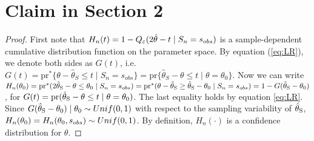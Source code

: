 	
\section{Claim in Section 2} 
\begin{proof} First note that $H_n(t) = 1 - Q_{\veps}(2\hat{\theta}-t \mid S_n = s_{obs})$ is a sample-dependent cumulative distribution function on the parameter space. 
By equation (\ref{eq:LR}), we denote both sides as $G(t)$, i.e. $G(t) = \text{pr}^*\{ \theta - \hat \theta_S \leq t \mid S_n = s_{obs} \} = \text{pr}\{\hat \theta_S - \theta \leq t \mid  \theta = \theta_0\}$.
Now we can write $H_n(\theta_0)  
		= \text{pr}^*(2\htheta - \theta \leq \theta_0 \mid  S_n = s_{\rm obs} )
		= \text{pr}^*(\theta - \htheta \geq \htheta- \theta_0 \mid  S_n = s_{\rm obs} )
		= 1 - G(\htheta - \theta_0)$, for $G(t) = \text{pr}(\htheta - \theta \leq t \mid \theta = \theta_0)$. The last equality holds by equation \eqref{eq:LR}. Since $G(\htheta - \theta_0) \mid  \theta_0 \sim Unif(0,1)$ with respect to the sampling variability of $\htheta$, $H_n(\theta_0) = H_n(\theta_0, s_{\rm obs}) \sim Unif(0,1)$. By definition, $H_n(\cdot)$ is a confidence distribution for $\theta$.  
\end{proof}
	
	
